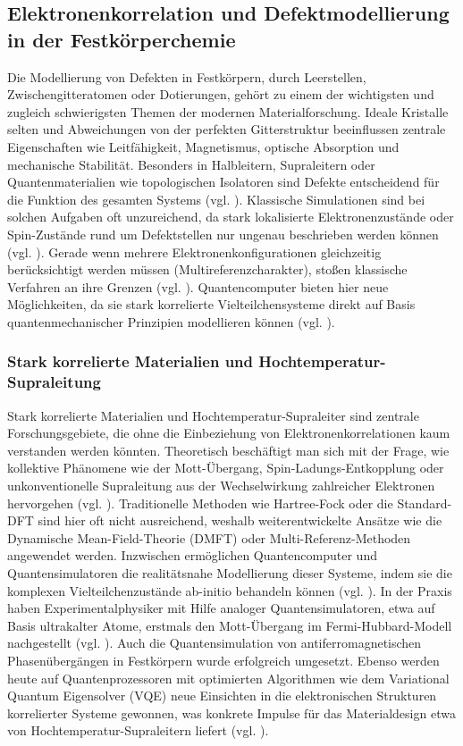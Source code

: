 \subsection{Elektronenkorrelation und Defektmodellierung in der Festkörperchemie}

{Die Modellierung von Defekten in Festkörpern, durch Leerstellen, Zwischengitteratomen oder Dotierungen, gehört zu einem der wichtigsten und zugleich schwierigsten Themen der modernen Materialforschung. Ideale Kristalle selten und Abweichungen von der perfekten Gitterstruktur beeinflussen zentrale Eigenschaften wie Leitfähigkeit, Magnetismus, optische Absorption und mechanische Stabilität. Besonders in Halbleitern, Supraleitern oder Quantenmaterialien wie topologischen Isolatoren sind Defekte entscheidend für die Funktion des gesamten Systems (vgl. \cite{bassett_quantum_2019}).
Klassische Simulationen sind bei solchen Aufgaben oft unzureichend, da stark lokalisierte Elektronenzustände oder Spin-Zustände rund um Defektstellen nur ungenau beschrieben werden können (vgl. \cite{bauer_quantum_2020}). Gerade wenn mehrere Elektronenkonfigurationen gleichzeitig berücksichtigt werden müssen (Multireferenzcharakter), stoßen klassische Verfahren an ihre Grenzen (vgl. \cite{bassett_quantum_2019}).
Quantencomputer bieten hier neue Möglichkeiten, da sie stark korrelierte Vielteilchensysteme direkt auf Basis quantenmechanischer Prinzipien modellieren können (vgl. \cite{daley_practical_2022}).

\subsubsection{Stark korrelierte Materialien und Hochtemperatur-Supraleitung}

Stark korrelierte Materialien und Hochtemperatur-Supraleiter sind zentrale Forschungsgebiete, die ohne die Einbeziehung von Elektronenkorrelationen kaum verstanden werden könnten. Theoretisch beschäftigt man sich mit der Frage, wie kollektive Phänomene wie der Mott-Übergang, Spin-Ladungs-Entkopplung oder unkonventionelle Supraleitung aus der Wechselwirkung zahlreicher Elektronen hervorgehen (vgl. \cite{daley_practical_2022}). Traditionelle Methoden wie Hartree-Fock oder die Standard-DFT sind hier oft nicht ausreichend, weshalb weiterentwickelte Ansätze wie die Dynamische Mean-Field-Theorie (DMFT) oder Multi-Referenz-Methoden angewendet werden. Inzwischen ermöglichen Quantencomputer und Quantensimulatoren die realitätsnahe Modellierung dieser Systeme, indem sie die komplexen Vielteilchenzustände ab-initio behandeln können (vgl. \cite{baker_simulating_2024}).
In der Praxis haben Experimentalphysiker mit Hilfe analoger Quantensimulatoren, etwa auf Basis ultrakalter Atome, erstmals den Mott-Übergang im Fermi-Hubbard-Modell nachgestellt (vgl. \cite{daley_practical_2022}). Auch die Quantensimulation von antiferromagnetischen Phasenübergängen in Festkörpern wurde erfolgreich umgesetzt. Ebenso werden heute auf Quantenprozessoren mit optimierten Algorithmen wie dem Variational Quantum Eigensolver (VQE) neue Einsichten in die elektronischen Strukturen korrelierter Systeme gewonnen, was konkrete Impulse für das Materialdesign etwa von Hochtemperatur-Supraleitern liefert (vgl. \cite{weidman_quantum_2024}).

}
